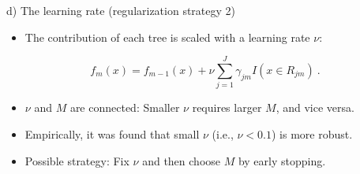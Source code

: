 \documentclass[
  10pt,
  ignorenonframetext,
]{beamer}
\providecommand{\tightlist}{%
  \setlength{\itemsep}{0pt}\setlength{\parskip}{0pt}}
\begin{document}
\begin{frame}
\begin{block}{d) The learning rate (regularization strategy 2)}
\protect\hypertarget{d-the-learning-rate-regularization-strategy-2}{}
\(~\)

\begin{itemize}
\tightlist
\item
  The contribution of each tree is scaled with a learning rate \(\nu\):
\end{itemize}

\[f_m(x) = f_{m-1}(x) + \nu \sum_{j=1}^J \gamma_{jm}I(x\in R_{jm}) \ .\]

\vspace{2mm}

\begin{itemize}
\tightlist
\item
  \(\nu\) and \(M\) are connected: Smaller \(\nu\) requires larger
  \(M\), and vice versa.
\end{itemize}

\vspace{2mm}

\begin{itemize}
\tightlist
\item
  Empirically, it was found that small \(\nu\) (i.e., \(\nu<0.1\)) is
  more robust.
\end{itemize}

\vspace{2mm}

\begin{itemize}
\tightlist
\item
  Possible strategy: Fix \(\nu\) and then choose \(M\) by early
  stopping.
\end{itemize}
\end{block}
\end{frame}
\end{document}
